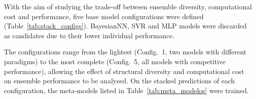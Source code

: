 With the aim of studying the trade-off between ensemble diversity, computational cost and performance, five base model configurations were defined (Table~\ref{tab:stack_configs}). BayesianNN, SVR and MLP models were discarded as candidates due to their lower individual performance.

\begin{table}[htbp]
  \centering
  \caption{\textit{Stacking} base model configurations.}
  \label{tab:stack_configs}
\end{table}

The configurations range from the lightest (Config.~1, two models with different paradigms) to the most complete (Config.~5, all models with competitive performance), allowing the effect of structural diversity and computational cost on ensemble performance to be analysed. On the stacked predictions of each configuration, the meta-models listed in Table~\ref{tab:meta_modelos} were trained.

\begin{table}
    \centering
    \caption{Meta-models used in \textit{stacking} together with their parameters.}
    \label{tab:meta_modelos}
    \footnotesize
\end{table}

